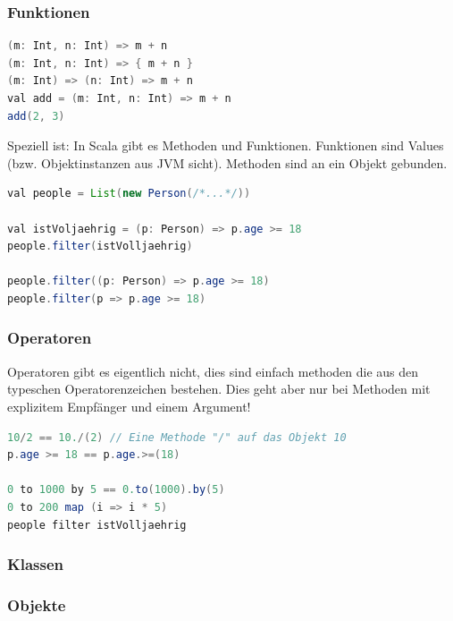 \subsubsection{Funktionen}

\begin{lstlisting}[language=java]
(m: Int, n: Int) => m + n
(m: Int, n: Int) => { m + n }
(m: Int) => (n: Int) => m + n
val add = (m: Int, n: Int) => m + n
add(2, 3)
\end{lstlisting}

Speziell ist: In Scala gibt es Methoden und Funktionen. Funktionen sind Values (bzw. Objektinstanzen aus JVM sicht). Methoden sind an ein Objekt gebunden.


\begin{lstlisting}[language=java]
val people = List(new Person(/*...*/))

val istVoljaehrig = (p: Person) => p.age >= 18
people.filter(istVolljaehrig)

people.filter((p: Person) => p.age >= 18)
people.filter(p => p.age >= 18)
\end{lstlisting}


\subsubsection{Operatoren}
Operatoren gibt es eigentlich nicht, dies sind einfach methoden die aus den typeschen Operatorenzeichen bestehen. Dies geht aber nur bei Methoden mit explizitem Empfänger und einem Argument!

\begin{lstlisting}[language=java]
10/2 == 10./(2) // Eine Methode "/" auf das Objekt 10
p.age >= 18 == p.age.>=(18)

0 to 1000 by 5 == 0.to(1000).by(5)
0 to 200 map (i => i * 5)
people filter istVolljaehrig
\end{lstlisting}

\subsubsection{Klassen}

\subsubsection{Objekte}




